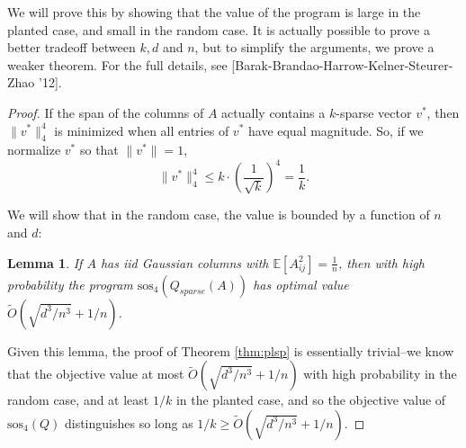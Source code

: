 \documentclass[a4paper,11pt]{article}
\newcommand{\E}{\mathbb{E}}
\newcommand{\sos}{\mathrm{sos}}
\newtheorem{lemma}{Lemma}
\theoremstyle{definition}
\begin{document}
We will prove this by showing that the value of the program is large in the planted case, and small in the random case.
It is actually possible to prove a better tradeoff between $k,d$ and $n$, but to simplify the arguments, we prove a weaker theorem.
For the full details, see [Barak-Brandao-Harrow-Kelner-Steurer-Zhao '12].

\begin{proof}
If the span of the columns of $A$ actually contains a $k$-sparse vector $v^*$, then $\|v^*\|_4^4$ is minimized when all entries of $v^*$ have equal magnitude.
So, if we normalize $v^*$ so that $\|v^*\| = 1$,
\[
\|v^*\|^4_4 \le k\cdot \left(\frac{1}{\sqrt{k}}\right)^{4} = \frac{1}{k}.
\]

We will show that in the random case, the value is bounded by a function of $n$ and $d$:
\begin{lemma}\label{lem:randomcase}
If $A$ has iid Gaussian columns with $\E[A_{ij}^2] = \frac{1}{n}$,
then with high probability the program $\sos_4(Q_{sparse}(A))$ has optimal value $\tilde{O}(\sqrt{d^3/n^3} + 1/n)$.
\end{lemma}
Given this lemma, the proof of Theorem \ref{thm:plsp} is essentially trivial--we know that the objective value at most $\tilde{O}(\sqrt{d^3/n^3} + 1/n)$ with high probability in the random case, and at least $1/k$ in the planted case, and so the objective value of $\sos_4(Q)$ distinguishes so long as $1/k \ge\tilde{O}(\sqrt{d^3/n^3} + 1/n)$.
\end{proof}
\end{document}
